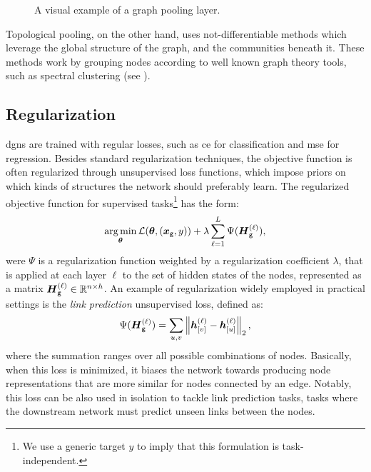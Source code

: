 \begin{figure*}[h!]
    \centering
    \resizebox{.8\textwidth}{!}{}
    \caption{A visual example of a graph pooling layer.}
    \label{fig:pooling}
\end{figure*}
Topological pooling, on the other hand,  uses not-differentiable methods which leverage the global structure of the graph, and the communities beneath it. These methods work by grouping nodes according to well known graph theory tools, such as spectral clustering (see \eg \citet{vonluxburg2007tutorialspectralclustering, dhillon2007weightedgraphcuts}).

\subsection{Regularization}
\glspl{dgn} are trained with regular losses, such as \gls{ce} for classification and \gls{mse} for regression. Besides standard regularization techniques, the objective function is often regularized through unsupervised loss functions, which impose priors on which kinds of
structures the network should preferably learn. The regularized objective function for supervised tasks\footnote{We use a generic target $y$ to imply that this formulation is task-independent.} has the form:
$$\argmin_{\Param} \Loss(\Param, (\Vector{x}_{\Graph{g}}, y)) + \lambda \sum_{\ell=1}^L \Psi(\LayerStateMat{g}{\ell}),$$
were $\Psi$ is a regularization function weighted by a regularization coefficient $\lambda$, that is applied at each layer $\ell$ to the set of hidden states of the nodes, represented as a matrix $\Matrix{h}_{{\Graph{g}}}^{(\ell)} \in \Real^{n \times h}$. An example of regularization widely employed in practical settings is the \emph{link prediction} unsupervised loss, defined as:
\begin{align}
    \Psi(\LayerStateMat{g}{\ell}) = \sum_{u,v} \Norm{\StateVector{v}{\ell} - \StateVector{u}{\ell}}_2,
\end{align}
where the summation ranges over all possible combinations of nodes. Basically, when this loss is minimized, it biases the network towards producing node representations that are more similar for nodes connected by an edge. Notably, this loss can be also used in isolation to tackle link prediction tasks, \ie tasks where the downstream network must predict unseen links between the nodes.